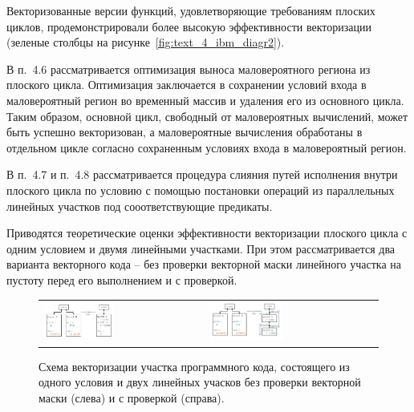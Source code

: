 \documentclass[a4paper,14pt]{extarticle}                     %
\theoremstyle{plain}                                         %
\begin{document}
Векторизованные версии функций, удовлетворяющие требованиям плоских циклов, продемонстрировали более высокую эффективности векторизации (зеленые столбцы на рисунке~\ref{fig:text_4_ibm_diagr2}).


В п.~4.6 рассматривается оптимизация выноса маловероятного региона из плоского цикла.
Оптимизация заключается в сохранении условий входа в маловероятный регион во временный массив и удаления его из основного цикла.
Таким образом, основной цикл, свободный от маловероятных вычислений, может быть успешно векторизован, а маловероятные вычисления обработаны в отдельном цикле согласно сохраненным условиях входа в маловероятный регион.


В п.~4.7 и п.~4.8 рассматривается процедура слияния путей исполнения внутри плоского цикла по условию с помощью постановки операций из параллельных линейных участков под сооответствующие предикаты.

Приводятся теоретические оценки эффективности векторизации плоского цикла с одним условием и двумя линейными участками.
При этом рассматривается два варианта векторного кода -- без проверки векторной маски линейного участка на пустоту перед его выполнением и с проверкой.

\begin{figure}[ht]
\centering
\begin{tabular}{ll}
	\includegraphics[width=0.45\textwidth]{./pics/text_4_vec_mrg_under_cond/cond.pdf}
	&
	\includegraphics[width=0.45\textwidth]{./pics/text_4_vec_check_mask/cond.pdf}
\end{tabular}
\singlespacing
{}\caption{Схема векторизации участка программного кода, состоящего из одного условия и двух линейных учасков без проверки векторной маски (слева) и с проверкой (справа).}
\label{fig:text_4_vec_mrg_under_cond_cond}
\end{figure}
\end{document}
